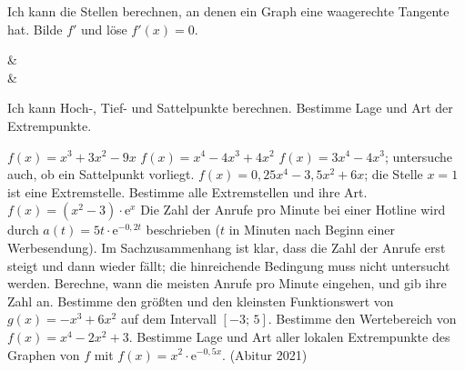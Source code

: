 \begin{aufgabe}{Ich kann die Stellen berechnen, an denen ein Graph eine waagerechte Tangente hat. Bilde $f'$ und löse $f'(x) = 0$.}
\begin{gleichungsraster}[3]
 &  \\
 &  \\
\end{gleichungsraster}
\end{aufgabe}

\begin{aufgabe}{Ich kann Hoch-, Tief- und Sattelpunkte berechnen. Bestimme Lage und Art der Extrempunkte.}
\begin{teile}
\teil $f(x) = x^3 + 3x^2 - 9x$
\teil $f(x) = x^4 - 4x^3 + 4x^2$
\teil $f(x) = 3x^4 - 4x^3$; untersuche auch, ob ein Sattelpunkt vorliegt.
\teil $f(x) = 0{,}25x^4 - 3{,}5x^2 + 6x$; die Stelle $x = 1$ ist eine Extremstelle. Bestimme alle Extremstellen und ihre Art.
\teil $f(x) = (x^2 - 3)\cdot\mathrm{e}^{x}$
\teil Die Zahl der Anrufe pro Minute bei einer Hotline wird durch $a(t) = 5t\cdot\mathrm{e}^{-0{,}2t}$ beschrieben ($t$ in Minuten nach Beginn einer Werbesendung). Im Sachzusammenhang ist klar, dass die Zahl der Anrufe erst steigt und dann wieder fällt; die hinreichende Bedingung muss nicht untersucht werden. Berechne, wann die meisten Anrufe pro Minute eingehen, und gib ihre Zahl an.
\teil Bestimme den größten und den kleinsten Funktionswert von $g(x) = -x^3 + 6x^2$ auf dem Intervall $[-3;\,5]$.
\teil Bestimme den Wertebereich von $f(x) = x^4 - 2x^2 + 3$.
\teil Bestimme Lage und Art aller lokalen Extrempunkte des Graphen von $f$ mit $f(x) = x^2\cdot\mathrm{e}^{-0{,}5x}$. (Abitur 2021)
\end{teile}
\end{aufgabe}

